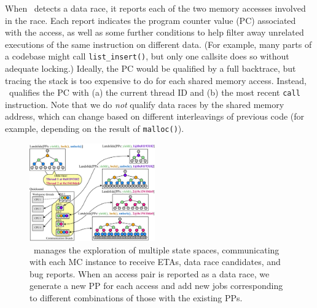 When \landslide~detects a data race, it reports each of the two memory accesses involved in the race.
Each report indicates the program counter value (PC) associated with the access, as well as some further conditions to help filter away unrelated executions of the same instruction on different data.
(For example, many parts of a codebase might call {\tt list\_insert()}, but only one callsite does so without adequate locking.)
Ideally, the PC would be qualified by a full backtrace, but tracing the stack is too expensive to do for each shared memory access.
Instead, \landslide~qualifies the PC with
(a) the current thread ID and
(b) the most recent {\tt call} instruction.
Note that we do {\em not} qualify data races by the shared memory address,
which can change based on different interleavings of previous code
(for example, depending on the result of {\tt malloc()}).

\begin{figure}[t]
	\includegraphics[width=0.48\textwidth]{dr-jobs.pdf}
	\caption{\quicksand~manages the exploration of multiple state spaces, communicating with each MC instance to receive ETAs, data race candidates, and bug reports.
		When an access pair is reported as a data race, we generate a new PP for each access and add new jobs corresponding to different combinations of those with the existing PPs.}
	\label{fig:new-dr-jobs}
\end{figure}


